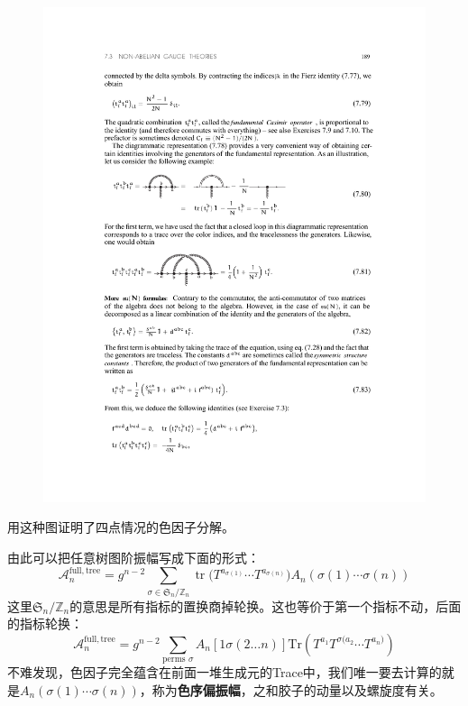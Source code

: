 \begin{remark}
\begin{figure}[H]
		\includegraphics{figs/fig19.pdf}
	\end{figure}
	\cite{Gelis:2019yfm}用这种图证明了四点情况的色因子分解。
\end{remark}
由此可以把任意树图阶振幅写成下面的形式：
\begin{equation}
	\mathcal{A}_n^{\mathrm{full,tree}}=g^{n-2}\sum_{\sigma\in\mathfrak{S}_n/\mathbb{Z}_n}\operatorname{tr}\Big(T^{a_{\sigma(1)}}\cdots T^{a_{\sigma(n)}}\Big)A_n(\sigma(1)\cdots\sigma(n))
\end{equation}
这里$\mathfrak{S}_n/\mathbb{Z}_n$的意思是所有指标的置换商掉轮换。这也等价于第一个指标不动，后面的指标轮换：
\begin{equation}
	\mathcal{A}_n^{\mathrm{full,tree}}=g^{n-2}\sum_{\text{perms }\sigma}A_n{\left[1\sigma(2\ldots n)\right]\mathrm{Tr}\left(T^{a_1}T^{\sigma(a_2}\cdots T^{a_n)}\right)}
\end{equation}
不难发现，色因子完全蕴含在前面一堆生成元的Trace中，我们唯一要去计算的就是$A_n(\sigma(1)\cdots\sigma(n))$，称为\textbf{色序偏振幅}，之和胶子的动量以及螺旋度有关。

